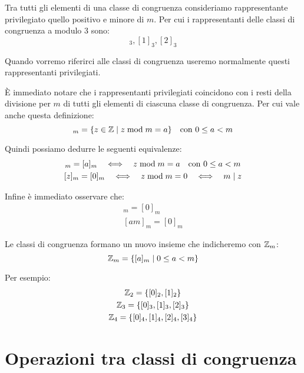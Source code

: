 Tra tutti gli elementi di una classe di congruenza consideriamo rappresentante privilegiato quello positivo e minore di $m$.
Per cui i rappresentanti delle classi di congruenza a modulo 3 sono:
\begin{equation*}
    [0]_3, [1]_3, [2]_3
\end{equation*}

Quando vorremo riferirci alle classi di congruenza useremo normalmente questi rappresentanti privilegiati.

È immediato notare che i rappresentanti privilegiati coincidono con i resti della divisione per $m$ di tutti gli elementi di ciascuna classe di congruenza.
Per cui vale anche questa definizione:
\begin{equation*}
    [a]_m = \{z \in \Z \mid z \modulo m = a\} \quad \text{con } 0 \le a < m
\end{equation*}

Quindi possiamo dedurre le seguenti equivalenze:
\begin{gather*}
    [z]_m = [a]_m \sse z \modulo m = a \quad \text{con } 0 \le a < m \\
    [z]_m = [0]_m \sse z \modulo m = 0 \sse m \divisore z
\end{gather*}

Infine è immediato osservare che:
\begin{gather*}
    [m]_m = [0]_m \\
    [am]_m = [0]_m
\end{gather*}

Le classi di congruenza formano un nuovo insieme che indicheremo con $ \mathbb{Z} _m$:
\begin{equation*}
     \mathbb{Z} _m= \{ [a]_m \mid 0 \le a < m \}
\end{equation*}

Per esempio:
\begin{gather*}
     \mathbb{Z} _2 = \{[0]_2, [1]_2\} \\
     \mathbb{Z} _3 = \{[0]_3, [1]_3, [2]_3\} \\
     \mathbb{Z} _4 = \{[0]_4, [1]_4, [2]_4, [3]_4\} \\
\end{gather*}

\section{Operazioni tra classi di congruenza}
\label{sec:operazioni_tra_classi_di_congruenza}

